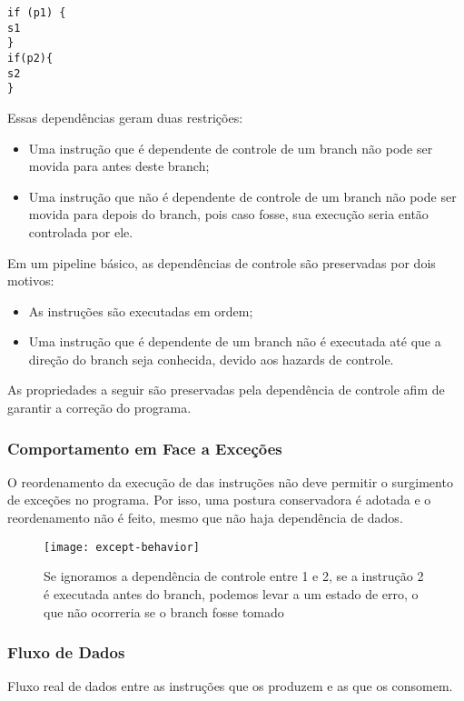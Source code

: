 \texttt{if (p1) \{ \\  s1\\\}\\if(p2)\{\\  s2\\\}}

Essas dependências geram duas restrições:
\begin{itemize}
  \item Uma instrução que é dependente de controle de um branch não pode ser movida para antes deste branch;

  \item Uma instrução que não é dependente de controle de um branch não pode ser movida para depois do branch, pois caso fosse, sua execução seria então controlada por ele.
\end{itemize}

Em um pipeline básico, as dependências de controle são preservadas por dois motivos:
\begin{itemize}
  \item As instruções são executadas em ordem;

  \item Uma instrução que é dependente de um branch não é executada até que a direção do branch seja conhecida, devido aos hazards de controle.
\end{itemize}

As propriedades a seguir são preservadas pela dependência de controle afim de garantir a correção do programa.



\subsubsection{Comportamento em Face a Exceções}
O reordenamento da execução de das instruções não deve permitir o surgimento de exceções no programa. Por isso, uma postura conservadora é adotada e o reordenamento não é feito, mesmo que não haja dependência de dados.

\begin{figure}[ht]
  \centering
  \texttt{[image: except-behavior]}
  \caption{Se ignoramos a dependência de controle entre 1 e 2, se a instrução 2 é executada antes do branch, podemos levar a um estado de erro, o que não ocorreria se o branch fosse tomado}
  \label{fig:except-behavior}
\end{figure}



\subsubsection{Fluxo de Dados}
\begin{definicao}{}
  Fluxo real de dados entre as instruções que os produzem e as que os consomem.
\end{definicao}

